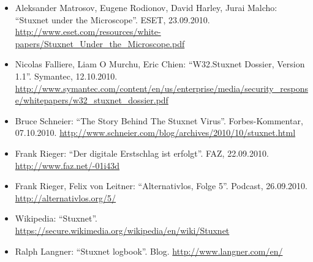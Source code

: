 \begin{itemize}
  \item Aleksander Matrosov, Eugene Rodionov, David Harley, Jurai
Malcho: \enquote{Stuxnet under the Microscope}. ESET, 23.09.2010.
\url{http://www.eset.com/resources/white-papers/Stuxnet_Under_the_Microscope.pdf}

  \item Nicolas Falliere, Liam O Murchu, Eric Chien:
\enquote{W32.Stuxnet Dossier, Version 1.1}. Symantec, 12.10.2010.
\url{http://www.symantec.com/content/en/us/enterprise/media/security_response/whitepapers/w32_stuxnet_dossier.pdf}

  \item Bruce Schneier: \enquote{The Story Behind The Stuxnet
Virus}. Forbes-Kommentar, 07.10.2010.
\url{http://www.schneier.com/blog/archives/2010/10/stuxnet.html}

  \item Frank Rieger: \enquote{Der digitale Erstschlag ist
erfolgt}. FAZ, 22.09.2010.  \url{http://www.faz.net/-01i43d}

  \item Frank Rieger, Felix von Leitner: \enquote{Alternativlos, Folge
5}. Podcast, 26.09.2010.  \url{http://alternativlos.org/5/}

  \item Wikipedia: \enquote{Stuxnet}.
\url{https://secure.wikimedia.org/wikipedia/en/wiki/Stuxnet}

  \item Ralph Langner: \enquote{Stuxnet logbook}. Blog.
\url{http://www.langner.com/en/}
\end{itemize}
